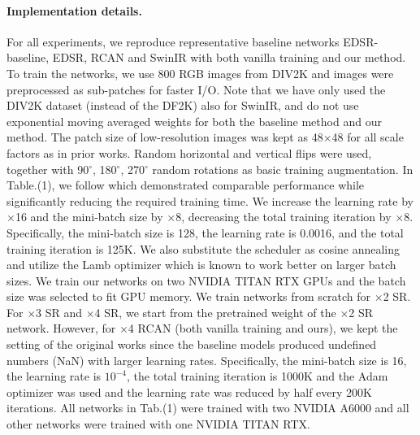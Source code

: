 \paragraph{Implementation details.}
For all experiments, we reproduce representative baseline networks EDSR-baseline, EDSR, RCAN and SwinIR with both vanilla training and our method. 
To train the networks, we use 800 RGB images from DIV2K \cite{div2k} and images were preprocessed as sub-patches for faster I/O. Note that we have only used the DIV2K dataset (instead of the DF2K) also for SwinIR, and do not use exponential moving averaged weights for both the baseline method and our method.
%
The patch size of low-resolution images was kept as 48$\times$48 for all scale factors as in prior works. Random horizontal and vertical flips were used, together with 90$^\circ$, 180$^\circ$, 270$^\circ$ random rotations as basic training augmentation. 
%
%
In Table.(1), we follow \cite{rcanit} which demonstrated comparable performance while significantly reducing the required training time.  We increase the learning rate by $\times$16 and the mini-batch size by $\times$8, decreasing the total training iteration by $\times$8. Specifically, the mini-batch size is 128, the learning rate is 0.0016, and the total training iteration is 125K.
%
We also substitute the scheduler as cosine annealing \cite{cosineannealing} and utilize the Lamb \cite{lamb} optimizer which is known to work better on larger batch sizes. We train our networks on two NVIDIA TITAN RTX GPUs and the batch size was selected to fit GPU memory. We train networks from scratch for $\times$2 SR. For $\times$3 SR and $\times$4 SR, we start from the pretrained weight of the $\times$2 SR network. 
%
However, for $\times$4 RCAN (both vanilla training and ours), we kept the setting of the original works \cite{SISR4_RCAN} since the baseline models produced undefined numbers (NaN) with larger learning rates. Specifically, the mini-batch size is 16, the learning rate is $10^{-4}$, the total training iteration is 1000K and the Adam optimizer was used and the learning rate was reduced by half every 200K iterations.
%
%
All networks in Tab.(1) were trained with two NVIDIA A6000 and all other networks were trained with one NVIDIA TITAN RTX.


